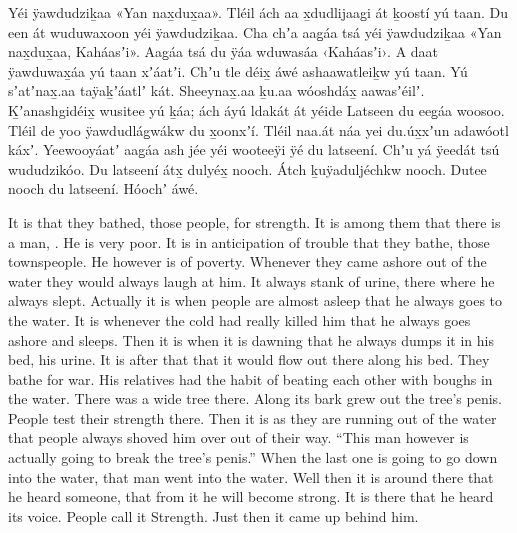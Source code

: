 \begin{pairs}
\begin{Leftside}
Yéi ÿawdudziḵaa «\!Yan nax̱dux̱aa\!».
Tléil ách aa x̱dudlijaag̱i át ḵoostí yú taan.
Du een át wuduwaxoon yéi ÿawdudziḵaa.
Cha chʼa aag̱áa tsá yéi ÿawdudziḵaa
«\!Yan nax̱dux̱aa, Kaháasʼi\!».
Aag̱áa tsá du ÿáa wduwasáa ‹\!Kaháasʼi\!›.
A daat ÿawduwax̱áa yú taan xʼáatʼi.
Chʼu tle déix̱ áwé ashaawatleiḵw yú taan.
Yú sʼatʼnax̱.aa taÿaḵʼáatlʼ kát.
Sheeynax̱.aa ḵu.aa wóoshdáx̱ aawasʼéilʼ.
Ḵʼanash\-gi\-déix̱ wusitee yú ḵáa;
ách áyú ldakát át yéide Latseen du eeg̱áa woosoo.
Tléil de yoo ÿawdudlág̱wákw du x̱oonxʼí.
Tléil naa.át náa yei du.úx̱xʼun adawóotl káxʼ.
Yeewooyáatʼ aag̱áa ash jée yéi wooteeÿi ÿé du latseení.
Chʼu yá ÿeedát tsú wududzikóo.
Du latseení átx̱ dulyéx̱ nooch.
Átch ḵuÿaduljéchkw nooch.
Dutee nooch du latseení.
Hóochʼ áwé.
\pend
\endnumbering
\end{Leftside}
\begin{Rightside}
\beginnumbering
\pstart
{}It is that they bathed, those people, for stre\-ngth.
It is among them that there is a man, .
He is very poor.
It is in anticipation of trouble that they bathe, those townspeople.
He however is of poverty.
Whenever they came ashore out of the water they would always laugh at him.
It always stank of urine, there where he always slept.
Actually it is when people are almost asleep that he always goes to the water.
It is whenever the cold had really killed him that he always goes ashore and sleeps.
Then it is when it is dawning that he always dumps it in his bed, his urine.
It is after that that it would flow out there along his bed.
They bathe for war.
His relatives had the habit of beating each other with boughs in the water.
There was a wide tree there.
Along its bark grew out the tree’s penis.
People test their strength there.
Then it is as they are running out of the water that people always shoved him over out of their way.
\qqk{}“This man however is actually going to break the tree’s penis.”
\pend
\pstart
{}When the last one is going to go down into the water, that man went into the water.
Well then it is around there that he heard someone, that from it he will become strong.
It is there that he heard its voice.
People call it Strength.
Just then it came up behind him.

\end{Rightside}
\end{pairs}

